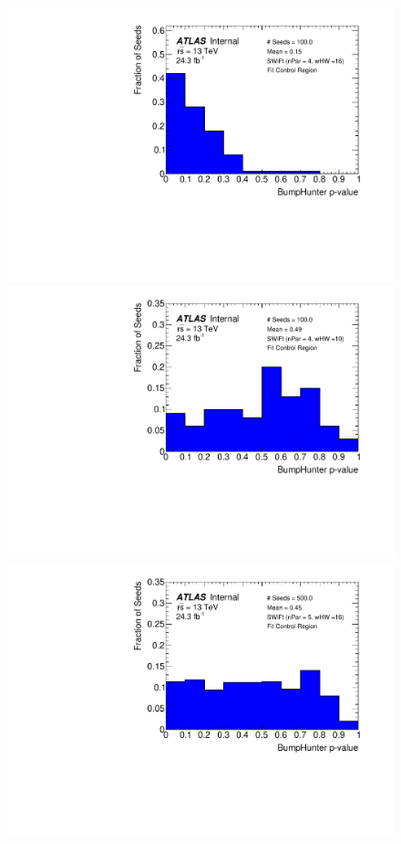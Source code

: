 \begin{figure}[!b]
\captionsetup[subfigure]{aboveskip=0pt,justification=centering}
\centering
{} {
  \includegraphics[width=0.48\linewidth, angle=0]{figs/Dibjet/LowMass/FitStudy_min566/pVal_bumpHunter_corrFitCR_4para_low16_high16.pdf}
}                                                                                              
 {                                                    
  \includegraphics[width=0.48\linewidth, angle=0]{figs/Dibjet/LowMass/FitStudy_min566/pVal_bumpHunter_corrFitCR_4para_low10_high10.pdf}
}                                                                                              
 {                                                    
  \includegraphics[width=0.48\linewidth, angle=0]{figs/Dibjet/LowMass/FitStudy_min566/pVal_bumpHunter_corrFitCR_5para_low16_high16.pdf}
}                                                                                              

\end{figure}

